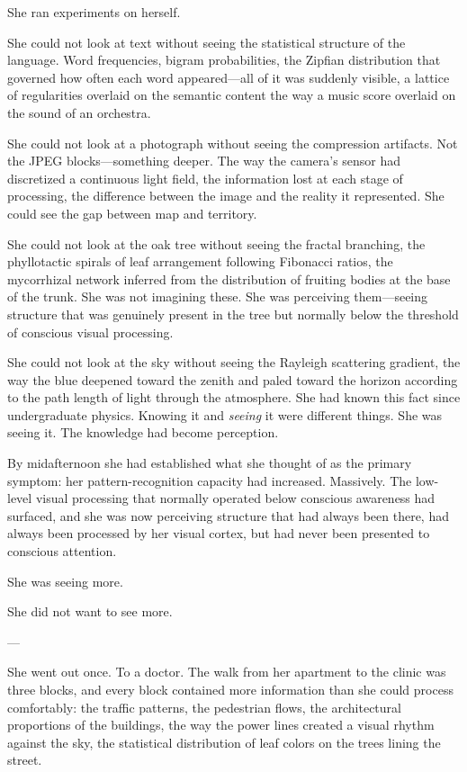 She ran experiments on herself.

She could not look at text without seeing the statistical structure of the language. Word frequencies, bigram probabilities, the Zipfian distribution that governed how often each word appeared---all of it was suddenly visible, a lattice of regularities overlaid on the semantic content the way a music score overlaid on the sound of an orchestra.

She could not look at a photograph without seeing the compression artifacts. Not the JPEG blocks---something deeper. The way the camera's sensor had discretized a continuous light field, the information lost at each stage of processing, the difference between the image and the reality it represented. She could see the gap between map and territory.

She could not look at the oak tree without seeing the fractal branching, the phyllotactic spirals of leaf arrangement following Fibonacci ratios, the mycorrhizal network inferred from the distribution of fruiting bodies at the base of the trunk. She was not imagining these. She was perceiving them---seeing structure that was genuinely present in the tree but normally below the threshold of conscious visual processing.

She could not look at the sky without seeing the Rayleigh scattering gradient, the way the blue deepened toward the zenith and paled toward the horizon according to the path length of light through the atmosphere. She had known this fact since undergraduate physics. Knowing it and \textit{seeing} it were different things. She was seeing it. The knowledge had become perception.

By midafternoon she had established what she thought of as the primary symptom: her pattern-recognition capacity had increased. Massively. The low-level visual processing that normally operated below conscious awareness had surfaced, and she was now perceiving structure that had always been there, had always been processed by her visual cortex, but had never been presented to conscious attention.

She was seeing more.

She did not want to see more.

---

She went out once. To a doctor. The walk from her apartment to the clinic was three blocks, and every block contained more information than she could process comfortably: the traffic patterns, the pedestrian flows, the architectural proportions of the buildings, the way the power lines created a visual rhythm against the sky, the statistical distribution of leaf colors on the trees lining the street.

